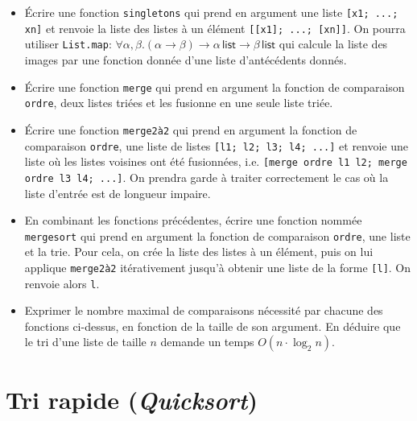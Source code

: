 \documentclass[11pt, a4paper]{article}
\begin{document}
\begin{itemize}

  \item[\textbf{B.1}] Écrire une fonction \texttt{singletons} qui
      prend en argument une liste \texttt{[x1; ...; xn]} et renvoie la
      liste des listes à un élément \texttt{[[x1]; ...; [xn]]}. On
      pourra utiliser {\tt List.map}: $\forall \alpha,\beta.(\alpha
      \rightarrow \beta) \rightarrow \alpha \, \textsf{list}
      \rightarrow \beta \, \textsf{list}$ qui calcule la liste des
      images par une fonction donnée d'une liste d'antécédents donnés.

  \item[\textbf{B.2}] Écrire une fonction {\tt merge} qui prend en
      argument la fonction de comparaison \texttt{ordre}, deux listes
      triées et les fusionne en une seule liste triée.

  \item[\textbf{B.3}] Écrire une fonction {\tt merge2à2} qui prend
      en argument la fonction de comparaison \texttt{ordre}, une liste
      de listes \texttt{[l1; l2; l3; l4; ...]}  et renvoie une liste
      où les listes voisines ont été fusionnées, i.e.  \texttt{[merge
      ordre l1 l2; merge ordre l3 l4; ...]}. On prendra garde à
      traiter correctement le cas où la liste d'entrée est de longueur
      impaire.

  \item[\textbf{B.4}] En combinant les fonctions précédentes, écrire
    une fonction nommée {\tt mergesort} qui prend en argument la
    fonction de comparaison \texttt{ordre}, une liste et la trie. Pour
    cela, on crée la liste des listes à un élément, puis on lui
    applique {\tt merge2à2} itérativement jusqu'à obtenir une liste de
    la forme \texttt{[l]}. On renvoie alors \texttt{l}.

  \item[\textbf{B.5}] Exprimer le nombre maximal de comparaisons
      nécessité par chacune des fonctions ci-dessus, en fonction de la
      taille de son argument. En déduire que le tri d'une liste de
      taille $n$ demande un temps $O(n \cdot \log_2 n)$.

\end{itemize}


\section{Tri rapide (\emph{Quicksort})}
\end{document}
